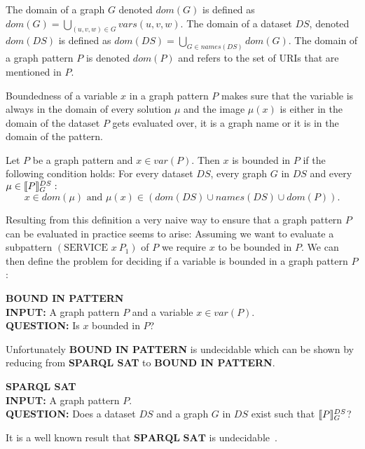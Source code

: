 \begin{definition}
	The domain of a graph $G$ denoted $dom(G)$ is defined as $dom(G) = \bigcup\limits_{(u,v,w) \in G}
	vars(u,v,w)$. The domain of a dataset $DS$, denoted $dom(DS)$ is defined as
	$dom(DS) = \bigcup\limits_{G \in names(DS)} dom(G)$.
	The domain of a graph pattern $P$ is denoted $dom(P)$ and refers to the set of URIs that are
	mentioned in $P$.
\end{definition}

Boundedness of a variable $x$ in a graph pattern $P$ makes sure that the
variable is always in the domain of every solution $\mu$ and the image $\mu(x)$ is either in the 
domain of the dataset $P$ gets evaluated over, it is a graph name or it is in the domain of the pattern.

\begin{definition}
	Let $P$ be a graph pattern and $x \in var(P)$. Then $x$ is bounded in $P$ if the
	following condition holds:
	For every dataset $DS$, every graph $G$ in $DS$ 
	and every $\mu \in \llbracket P \rrbracket^{DS}_G:$\\
	\[ x \in dom(\mu) \mbox{ and } \mu(x) \in (dom(DS) \cup names(DS) \cup dom(P)). \]
\end{definition}

Resulting from this definition a very naive way to ensure that
a graph pattern $P$ can be evaluated in practice seems to arise:
Assuming we want to evaluate a subpattern $(\mbox{SERVICE } x \ P_1)$ of $P$
we require $x$ to be bounded in $P$. We can then define the problem for deciding if a variable
is bounded in a graph pattern $P$:

\begin{framed}\noindent \textbf{BOUND IN PATTERN}\\
	\textbf{INPUT:} A graph pattern $P$ and a variable $x \in var(P)$.\\
	\textbf{QUESTION:} Is $x$ bounded in $P$?
\end{framed}
Unfortunately \textbf{BOUND IN PATTERN} is undecidable which can be shown by
reducing from \textbf{SPARQL SAT} to \textbf{BOUND IN PATTERN}.
\begin{framed}\noindent \textbf{SPARQL SAT}\\
	\textbf{INPUT:} A graph pattern $P$.\\
	\textbf{QUESTION:} Does a dataset $DS$ and a graph $G$ in $DS$ exist such
	that $\llbracket P \rrbracket^{DS}_G$?
\end{framed}
It is a well known result that $\textbf{SPARQL SAT}$ is undecidable~\cite{angles2008expressive}.


